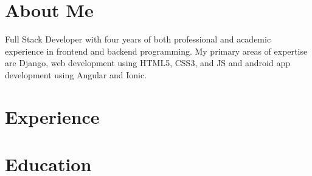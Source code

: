 \documentclass{article}
\begin{document}
\section{About Me}
Full Stack Developer with four years of both
professional and academic experience in frontend
and backend programming. My primary areas of
expertise are Django, web development using HTML5,
CSS3, and JS and android app development using
Angular and Ionic.

\section{Experience}

\section{Education}
\end{document}
